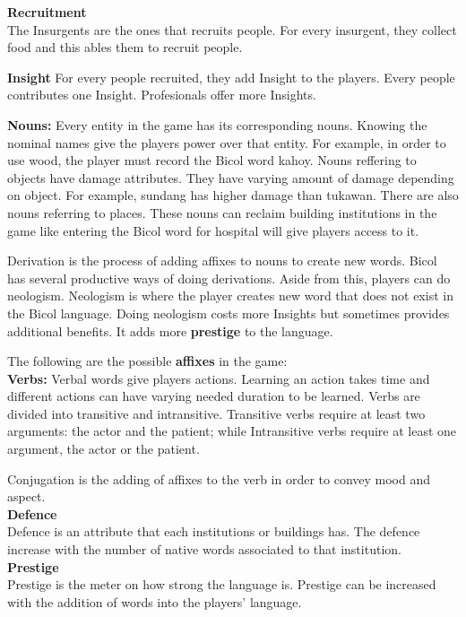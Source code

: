 \documentclass[11pt]{article}
\begin{document}
\textbf{Recruitment}\\
The Insurgents are the ones that recruits people. For every insurgent, they collect food and this ables them to recruit people.

\textbf{Insight}
For every people recruited, they add Insight to the players. Every people contributes one Insight. Profesionals offer more Insights.

\textbf{Nouns:}
Every entity in the game has its corresponding nouns. Knowing the nominal names give the players power over that entity. For example, in order to use wood, the player must record the Bicol word kahoy. Nouns reffering to objects have damage attributes. They have varying amount of damage depending on object. For example, sundang has higher damage than tukawan.
There are also nouns referring to places. These nouns can reclaim building institutions in the game like entering the Bicol word for hospital will give players access to it.

Derivation is the process of adding affixes to nouns to create new words. Bicol has several productive ways of doing derivations. Aside from this, players can do neologism. Neologism is where the player creates new word that does not exist in the Bicol language. Doing neologism costs more Insights but sometimes provides additional benefits. It adds more \textbf{prestige} to the language.

The following are the possible \textbf{affixes} in the game:\\


\textbf{Verbs:}
Verbal words give players actions. Learning an action takes time and different actions can have varying needed duration to be learned. Verbs are divided into transitive and intransitive. Transitive verbs require at least two arguments: the actor and the patient; while Intransitive verbs require at least one argument, the actor or the patient.

Conjugation is the adding of affixes to the verb in order to convey mood and aspect.\\

\textbf{Defence}\\
Defence is an attribute that each institutions or buildings has. The defence increase with the number of native words associated to that institution.\\

\textbf{Prestige}\\
Prestige is the meter on how strong the language is. Prestige can be increased with the addition of words into the players' language.\\
\end{document}
